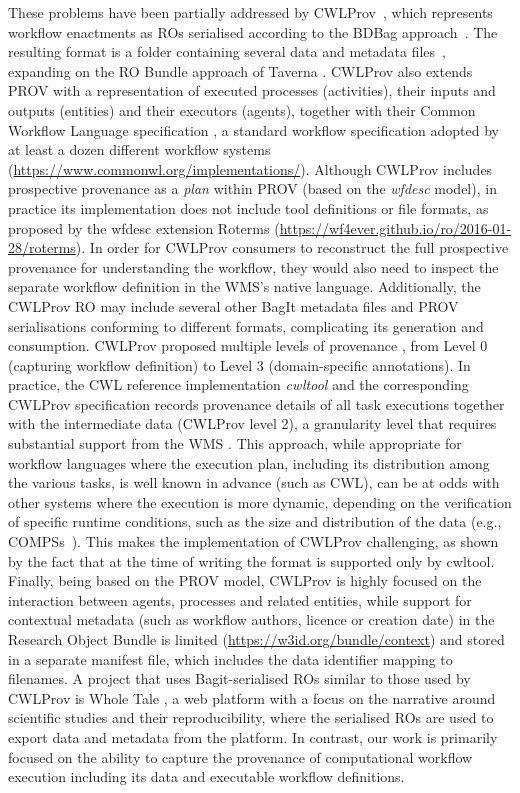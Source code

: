 \documentclass[10pt,letterpaper]{article}
\begin{document}
These problems have been partially addressed by CWLProv~\cite{Khan 2019}, which represents workflow enactments as ROs serialised according to the BDBag approach~\cite{Chard 2016}.
The resulting format is a folder containing several data and metadata files~\cite{Soiland-Reyes 2018}, expanding on the RO Bundle approach of Taverna \cite{Soiland-Reyes 2016}.
CWLProv also extends PROV with a representation of executed processes (activities), their inputs and outputs (entities) and their executors (agents), together with their Common Workflow Language specification
\cite{Crusoe 2022}, a standard workflow specification adopted by at least a dozen different workflow systems (\url{https://www.commonwl.org/implementations/}). Although CWLProv includes prospective provenance as a \emph{plan}
within PROV (based on the \emph{wfdesc} model), in practice its implementation does not include tool definitions or file formats, as proposed by the wfdesc extension Roterms (\url{https://wf4ever.github.io/ro/2016-01-28/roterms}).
In order for CWLProv consumers to reconstruct the full prospective provenance for understanding the workflow, they would also need to inspect the separate workflow definition in the WMS's native language.
Additionally, the CWLProv RO may include several other BagIt metadata files and PROV serialisations conforming to different formats, complicating its generation and consumption.
CWLProv proposed multiple levels of provenance \cite[figure 2]{Khan 2019}, from Level 0 (capturing workflow definition) to Level 3 (domain-specific annotations). 
In practice, the CWL reference implementation \emph{cwltool} \cite{Amstutz 2023} and the corresponding CWLProv specification \cite{Soiland-Reyes 2018} records provenance details of all task executions together with the intermediate data (CWLProv level 2), a granularity level that requires substantial support from the WMS
\cite{Soiland-Reyes 2022a}.
This approach, while appropriate for workflow languages where the execution plan, including its distribution among the various tasks, is well known in advance (such as CWL), can be at odds with other systems where the execution is more dynamic, depending on the verification of specific runtime conditions, such as the size and distribution of the data (e.g., COMPSs~\cite{Lordan 2014}).
This makes the implementation of CWLProv challenging, as shown by the fact that at the time of writing the format is supported only by cwltool.
Finally, being based on the PROV model, CWLProv is highly focused on the interaction between agents, processes and related entities, while support for contextual metadata (such as workflow authors, licence or creation date) in the Research Object Bundle is limited (\url{https://w3id.org/bundle/context}) and stored in a separate manifest file, which includes the data identifier mapping to filenames.
A project that uses Bagit-serialised ROs similar to those used by CWLProv is Whole Tale \cite{Chard 2019}, a web platform with a focus on the narrative around scientific studies and their reproducibility, where the serialised ROs are used to export data and metadata from the platform. In contrast, our work is primarily focused on the ability to capture the provenance of computational workflow execution including its data and executable workflow definitions.
\end{document}
